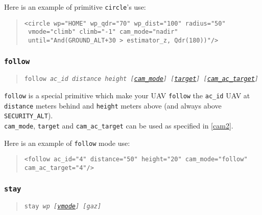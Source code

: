 \documentclass{article}
\renewcommand{\tt}[1]{\texttt{#1}}
\newcommand{\ex}[1]{\colorbox[gray]{0.92}{\tt{#1}}}
\newcommand{\hs}[1]{\hspace*{#1cm}}
\newcommand{\qt}[1]{\textcolor{gris75}{#1}}
\begin{document}
\begin{minipage}[ctb]{\textwidth}
Here is an example of primitive \tt{circle}'s use:
\begin{quote}
	\ex{<circle wp="\qt{HOME}" wp\_qdr="\qt{70}" wp\_dist="\qt{100}" radius="\qt{50}"} \\
	\ex{\hs{1.3} vmode="\qt{climb}" climb="\qt{-1}" cam\_mode="\qt{nadir}"} \\
	\ex{\hs{1.3} until="\qt{And(GROUND\_ALT+30 > estimator\_z, Qdr(180))}"/>} \\
\end{quote}
\end{minipage}


\hypertarget{follow}{\subsubsection{\tt{follow}}}
\begin{quote}
	\tt{follow \emph{ac\_id distance height [\hyperlink{cam}{cam\_mode}]
	[\hyperlink{cam}{target}] [\hyperlink{cam}{cam\_ac\_target}]}}
\end{quote}

\tt{follow} is a special primitive which make your UAV \tt{follow} the
\tt{ac\_id} UAV at \tt{distance} meters behind and \tt{height} meters above
(and always above \tt{SECURITY\_ALT}). \\

\tt{cam\_mode}, \tt{target} and \tt{cam\_ac\_target} can be used as
specified in \autoref{cam2}. \\

\begin{minipage}[ctb]{\textwidth}
Here is an example of \tt{follow} mode use:
\begin{quote}
	\ex{<follow ac\_id="\qt{4}" distance="\qt{50}" height="\qt{20}" cam\_mode="\qt{follow}" cam\_ac\_target="\qt{4}"/>} \\
\end{quote}
\end{minipage}


\hypertarget{stay}{\subsubsection{\tt{stay}}}
\begin{quote}
	\tt{stay \emph{wp [\hyperlink{verticalmodes}{vmode}] [gaz]}}
\end{quote}
\end{document}
